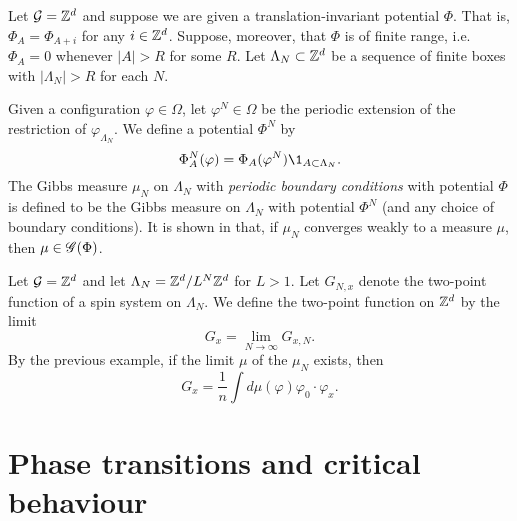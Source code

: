 \begin{example}
Let $\mathcal{G} = { {{\mathbb Z}}^d }$ and suppose we are given a translation-invariant potential $\Phi$.
That is, $\Phi_A = \Phi_{A + i}$ for any $i \in { {{\mathbb Z}}^d }$.
Suppose, moreover, that $\Phi$ is of finite range, i.e.\ $\Phi_A = 0$ whenever
$|A| > R$ for some $R$. Let $\Lambda_N \subset { {{\mathbb Z}}^d }$ be a sequence of finite boxes
with $|\Lambda_N| > R$ for each $N$.

Given a configuration $\varphi \in \Omega$, let $\varphi^N \in \Omega$
be the periodic extension of the restriction of $\varphi_{\Lambda_N}$.
We define a potential $\Phi^N$ by
\begin{equation}
\Phi^N_A(\varphi) = \Phi_A(\varphi^N) \1_{A \subset \Lambda_N}.
\end{equation}
The Gibbs measure $\mu_N$ on $\Lambda_N$ with \emph{periodic boundary conditions}
with potential $\Phi$ is defined to be the Gibbs measure on $\Lambda_N$ with
potential $\Phi^N$ (and any choice of boundary conditions).
It is shown in \cite[Example 4.20]{Georgii11} that, if $\mu_N$ converges weakly to a
measure $\mu$, then $\mu \in \mathscr{G}(\Phi)$.
\end{example}

\begin{example}
Let $\mathcal{G} = { {{\mathbb Z}}^d }$ and let $\Lambda_N = { {{\mathbb Z}}^d }/L^N{ {{\mathbb Z}}^d }$ for $L > 1$.
Let $G_{N,x}$ denote the two-point function of a spin system on $\Lambda_N$.
We define the two-point function on ${ {{\mathbb Z}}^d }$ by the limit
\begin{equation}
G_x = \lim_{N\to\infty} G_{x,N}.
\end{equation}
By the previous example, if the limit $\mu$ of the $\mu_N$ exists, then
\begin{equation}
G_x = \frac{1}{n} \int d\mu(\varphi) \varphi_0 \cdot \varphi_x.
\end{equation}
\end{example}


\section{Phase transitions and critical behaviour}

